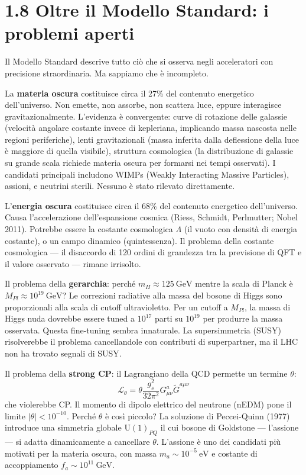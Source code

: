 \documentclass[11.5pt,a4paper,openany]{book}
\theoremstyle{remark}
\begin{document}
\section{1.8 Oltre il Modello Standard: i problemi aperti}

Il Modello Standard descrive tutto ciò che si osserva negli acceleratori con precisione straordinaria. Ma sappiamo che è incompleto.

La \textbf{materia oscura} costituisce circa il 27\% del contenuto energetico dell'universo. Non emette, non assorbe, non scattera luce, eppure interagisce gravitazionalmente. L'evidenza è convergente: curve di rotazione delle galassie (velocità angolare costante invece di kepleriana, implicando massa nascosta nelle regioni periferiche), lenti gravitazionali (massa inferita dalla deflessione della luce è maggiore di quella visibile), struttura cosmologica (la distribuzione di galassie su grande scala richiede materia oscura per formarsi nei tempi osservati). I candidati principali includono WIMPs (Weakly Interacting Massive Particles), assioni, e neutrini sterili. Nessuno è stato rilevato direttamente.

L'\textbf{energia oscura} costituisce circa il 68\% del contenuto energetico dell'universo. Causa l'accelerazione dell'espansione cosmica (Riess, Schmidt, Perlmutter; Nobel 2011). Potrebbe essere la costante cosmologica $\Lambda$ (il vuoto con densità di energia costante), o un campo dinamico (quintessenza). Il problema della costante cosmologica --- il disaccordo di 120 ordini di grandezza tra la previsione di QFT e il valore osservato --- rimane irrisolto.

Il problema della \textbf{gerarchia}: perché $m_H \approx 125\ \text{GeV}$ mentre la scala di Planck è $M_{Pl} \approx 10^{19}\ \text{GeV}$? Le correzioni radiative alla massa del bosone di Higgs sono proporzionali alla scala di cutoff ultravioletto. Per un cutoff a $M_{Pl}$, la massa di Higgs nuda dovrebbe essere tuned a $10^{17}$ parti su $10^{19}$ per produrre la massa osservata. Questa fine-tuning sembra innaturale. La supersimmetria (SUSY) risolverebbe il problema cancellandole con contributi di superpartner, ma il LHC non ha trovato segnali di SUSY.

Il problema della \textbf{strong CP}: il Lagrangiano della QCD permette un termine $\theta$:
\[
\mathcal{L}_\theta = \theta \frac{g_s^2}{32\pi^2} G^a_{\mu\nu}\tilde G^{a\mu\nu}
\]
che violerebbe CP. Il momento di dipolo elettrico del neutrone (nEDM) pone il limite $|\theta| < 10^{-10}$. Perché $\theta$ è così piccolo? La soluzione di Peccei-Quinn (1977) introduce una simmetria globale $\mathrm{U}(1)_{PQ}$ il cui bosone di Goldstone --- l'assione --- si adatta dinamicamente a cancellare $\theta$. L'assione è uno dei candidati più motivati per la materia oscura, con massa $m_a \sim 10^{-5}\ \text{eV}$ e costante di accoppiamento $f_a \sim 10^{11}\ \text{GeV}$.
\end{document}

